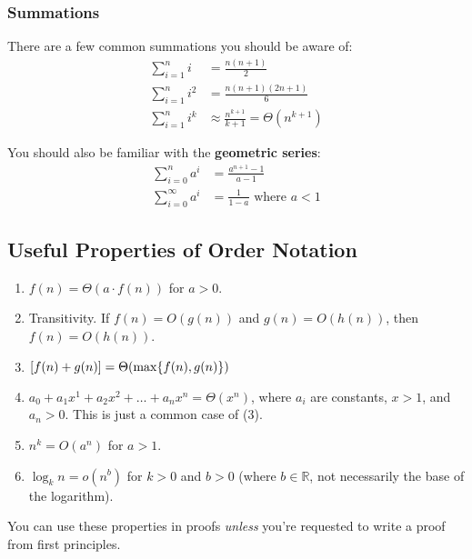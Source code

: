 \documentclass[]{article}
\theoremstyle{definition}
\DeclarePairedDelimiter{\set}{\lbrace}{\rbrace}
\begin{document}
			\subsubsection{Summations}
				There are a few common summations you should be aware of:
				\begin{align*}
					\sum_{i = 1}^{n} i &= \frac{n(n+1)}{2} \\
					\sum_{i = 1}^{n} i^2 &= \frac{n(n+1)(2n+1)}{6} \\
					\sum_{i = 1}^{n} i^k &\approx \frac{n^{k + 1}}{k + 1} = \Theta(n^{k + 1})
				\end{align*}

				You should also be familiar with the \textbf{geometric series}:
				\begin{align*}
					\sum_{i = 0}^{n} a^i &= \frac{a^{n + 1} - 1}{a - 1} \\
					\sum_{i = 0}^{\infty} a^i &= \frac{1}{1 - a} \text{ where } a < 1
				\end{align*}
		\subsection{Useful Properties of Order Notation}
			\begin{enumerate}
				\item $f(n) = \Theta(a \cdot f(n))$ for $a > 0$.
				\item Transitivity. If $f(n) = O(g(n))$ and $g(n) = O(h(n))$, then $f(n) = O(h(n))$.
				\item $[f(n) + g(n)] = \Theta(\max\set{f(n), g(n) })$
				\item $a_0 + a_1 x^1 + a_2 x^2 + \ldots + a_n x^n = \Theta(x^n)$, where $a_i$ are constants, $x > 1$, and $a_n > 0$. This is just a common case of (3).
				\item $n^k = O(a^n)$ for $a > 1$.
				\item $\log_k n = o(n^b)$ for $k > 0$ and $b > 0$ (where $b \in \mathbb{R}$, not necessarily the base of the logarithm).
			\end{enumerate}

			You can use these properties in proofs \emph{unless} you're requested to write a proof from first principles.
\end{document}
